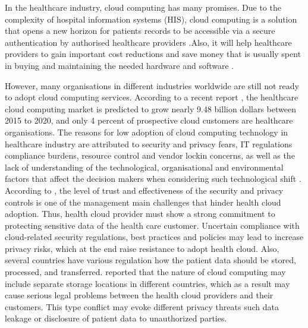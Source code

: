 In the healthcare industry, cloud computing has many promises. Due to the complexity of hospital information systems (HIS), cloud computing is a solution that opens a new horizon for patients records to be accessible via a secure authentication by authorised healthcare providers \cite{Grindle2013}.Also, it will help healthcare providers to gain important cost reductions and save money that is usually spent in buying and maintaining the needed hardware and software \cite{ahuja2012survey,Masrom2014}.

However, many organisations in different industries worldwide are still not ready to adopt cloud computing services. According to a recent report  \cite{MarketsandMarkets}, the healthcare cloud computing market is predicted to grow nearly 9.48 billion dollars between 2015 to 2020, and only 4 percent of prospective cloud customers are healthcare organisations. The reasons for low adoption of cloud computing technology in healthcare industry are attributed to security and privacy fears, IT regulations compliance burdens, resource control and vendor lockin concerns, as well as the lack of understanding of the technological, organisational and environmental factors that affect the decision makers when considering such technological shift \cite{MarketsandMarkets,tweel2012examining}.
\\
According to \citet{Mu2011}, the level of trust and effectiveness of the security and privacy controls is one of the management main challenges that hinder health cloud adoption. Thus, health cloud provider must show a strong commitment to protecting sensitive data of the health care customer. Uncertain compliance with cloud-related security regulations, best practices and policies may lead to increase privacy risks, which at the end raise resistance to adopt health cloud. Also, several countries have various regulation how the patient data should be stored, processed, and transferred.\cite{Mu2011} reported that the nature of cloud computing may include separate storage locations in different countries, which as a result may cause serious legal problems between the health cloud providers and their customers. This type conflict may evoke different privacy threats such data leakage or disclosure of patient data to unauthorized parties.




